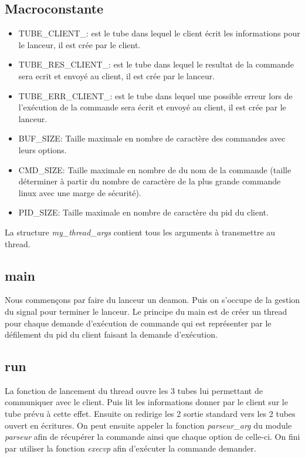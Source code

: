 \documentclass[12pt]{article}
\begin{document}
\subsection{Macroconstante}
\begin{itemize}
      \item TUBE\_CLIENT\_: est le tube dans lequel le client écrit les
            informations
            pour le lanceur, il est crée par le client.
      \item TUBE\_RES\_CLIENT\_: est le tube dans lequel le resultat de la
            commande
            sera ecrit et envoyé au client, il est crée par le lanceur.
      \item TUBE\_ERR\_CLIENT\_: est le tube dans lequel une possible erreur
            lors
            de l'exécution de la commande sera écrit et envoyé au client, il
            est
            crée par le lanceur.
      \item BUF\_SIZE: Taille maximale en nombre de caractère des commandes
            avec
            leurs options.
      \item CMD\_SIZE: Taille maximale en nombre de  du nom de la commande
            (taille déterminer à partir du nombre de caractère de la plus
            grande
            commande
            linux avec une marge de sécurité).
      \item PID\_SIZE: Taille maximale en nombre de caractère du pid du client.
\end{itemize}
La structure \textit{my\_thread\_args} contient tous les arguments à
transmettre au thread.
\subsection{main}
Nous commençons par faire du lanceur un deamon. Puis on s'occupe de la gestion
du signal pour
terminer le lanceur.
Le principe du main est de créer un thread pour chaque demande d'exécution de
commande qui est représenter par le défilement du pid du client faisant la
demande d'exécution.
\subsection{run}
La fonction de lancement du thread ouvre les 3 tubes lui permettant de
communiquer
avec le client. Puis lit les informations donner par le client sur le tube
prévu
à cette effet. Ensuite on redirige les 2 sortie standard vers les 2 tubes
ouvert en écritures. On peut ensuite appeler la fonction \textit{parseur\_arg}
du module \textit{parseur} afin de récupérer la commande ainsi que chaque
option de celle-ci. On fini par utiliser la fonction \textit{execvp} afin
d'exécuter la commande demander.
\end{document}
